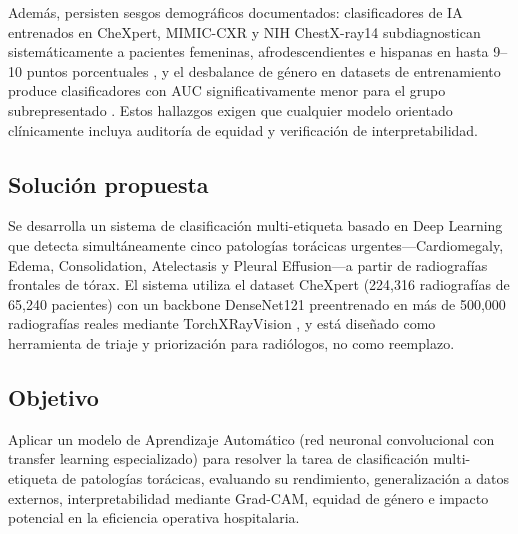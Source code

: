 Adem\'as, persisten sesgos demogr\'aficos documentados: clasificadores de IA entrenados en CheXpert, MIMIC-CXR y NIH ChestX-ray14 subdiagnostican sistem\'aticamente a pacientes femeninas, afrodescendientes e hispanas en hasta 9--10 puntos porcentuales \cite{seyyedkalantari2021bias}, y el desbalance de g\'enero en datasets de entrenamiento produce clasificadores con AUC significativamente menor para el grupo subrepresentado \cite{larrazabal2020gender}. Estos hallazgos exigen que cualquier modelo orientado cl\'inicamente incluya auditor\'ia de equidad y verificaci\'on de interpretabilidad.

\subsection{Soluci\'on propuesta}

Se desarrolla un sistema de clasificaci\'on multi-etiqueta basado en Deep Learning que detecta simult\'aneamente cinco patolog\'ias tor\'acicas urgentes---Cardiomegaly, Edema, Consolidation, Atelectasis y Pleural Effusion---a partir de radiograf\'ias frontales de t\'orax. El sistema utiliza el dataset CheXpert (224,316 radiograf\'ias de 65,240 pacientes) \cite{irvin2019chexpert} con un backbone DenseNet121 preentrenado en m\'as de 500,000 radiograf\'ias reales mediante TorchXRayVision \cite{cohen2022torchxrayvision}, y est\'a dise\~nado como herramienta de triaje y priorizaci\'on para radi\'ologos, no como reemplazo.

\subsection{Objetivo}

Aplicar un modelo de Aprendizaje Autom\'atico (red neuronal convolucional con transfer learning especializado) para resolver la tarea de clasificaci\'on multi-etiqueta de patolog\'ias tor\'acicas, evaluando su rendimiento, generalizaci\'on a datos externos, interpretabilidad mediante Grad-CAM, equidad de g\'enero e impacto potencial en la eficiencia operativa hospitalaria.
